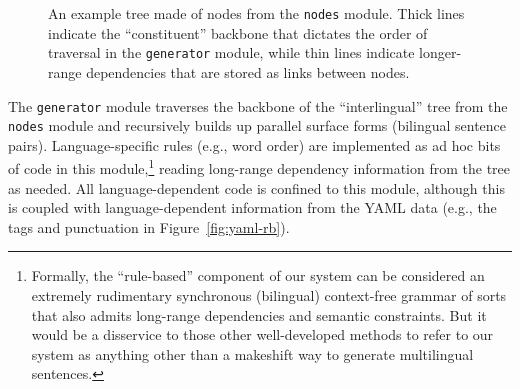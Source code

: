 {\begin{figure}[ht]
    \caption{
        An example tree made of nodes from the {\small \tt nodes} module.
        Thick lines indicate the ``constituent'' backbone that dictates the order of traversal in the {\small \tt generator} module, while thin lines indicate longer-range dependencies that are stored as links between nodes.
    }
    \label{fig:tree}

\end{figure}
    




The {\small \tt generator} module traverses the backbone of the ``interlingual'' tree from the {\small \tt nodes} module and recursively builds up parallel surface forms (bilingual sentence pairs).
Language-specific rules (e.g., word order) are implemented as ad hoc bits of code in this module,\footnote{
    Formally, the ``rule-based'' component of our system can be considered an extremely rudimentary synchronous (bilingual) context-free grammar of sorts  that also admits long-range dependencies and semantic constraints.
    But it would be a disservice to those other well-developed methods to refer to our system as anything other than a makeshift way to generate multilingual sentences.
} reading long-range dependency information from the tree as needed.
All language-dependent code is confined to this module, although this is coupled with language-dependent information from the YAML data (e.g., the tags and punctuation in Figure~\ref{fig:yaml-rb}). 


}
